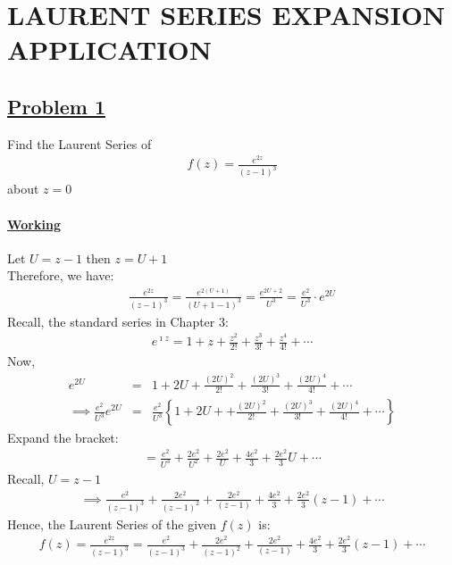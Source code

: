 \documentclass[12pt]{report}
\newcommand{\ubt}[1]{\textbf{\underline{#1}}}
\newcommand{\sps}{\\[0.2cm]}
\newcommand{\imaginary}{\imath}
\newcommand{\problem}[1]{\section*{\ubt{Problem #1}}}
\newcommand{\working}{\subsubsection{\ubt{Working}}}
\begin{document}
	\chapter{LAURENT SERIES EXPANSION APPLICATION}
	\problem{1}
	Find the Laurent Series of 
	\begin{eqnarray*}
		f(z) = \frac{e^{2z}}{(z-1)^3}
	\end{eqnarray*}
	about $z=0$
	\working
	Let $U=z-1$ then $z=U+1$\\
	Therefore, we have:
	\begin{eqnarray*}
		\frac{e^{2z}}{(z-1)^3} = \frac{e^{2(U+1)}}{(U+1-1)^3} = \frac{e^{2U+2}}{U^3} = \frac{e^2}{U^3} \cdot e^{2U}
	\end{eqnarray*}
	Recall, the standard series in Chapter 3:
	\begin{eqnarray*}
		e^{\imaginary z} = 1 + z + \frac{z^2}{2!} + \frac{z^3}{3!} + \frac{z^4}{4!} + \cdots
	\end{eqnarray*}
	Now, 
	\begin{eqnarray*}
		e^{2U} &=& 1 + 2U + \frac{(2U)^2}{2!} + \frac{(2U)^3}{3!}+ \frac{(2U)^4}{4!} + \cdots\sps
		\implies \frac{e^2}{U^3}e^{2U} &=&\frac{e^2}{U^3}\left\{ 1 + 2U + + \frac{(2U)^2}{2!}+ \frac{(2U)^3}{3!}+ \frac{(2U)^4}{4!} + \cdots \right\}
	\end{eqnarray*}
	Expand the bracket:
	\begin{eqnarray*}
		= \frac{e^2}{U^3} + \frac{2e^2}{U^2} + \frac{2e^2}{U}+ \frac{4e^2}{3}+ \frac{2e^2}{3}U + \cdots 
	\end{eqnarray*}
	Recall, $U=z-1$
	\begin{eqnarray*}
		\implies \frac{e^2}{(z-1)^3} + \frac{2e^2}{(z-1)^2} + \frac{2e^2}{(z-1)} + \frac{4e^2}{3} + \frac{2e^2}{3}(z-1) + \cdots
	\end{eqnarray*}
	Hence, the Laurent Series of the given $f(z)$ is:
	\begin{eqnarray*}
		f(z) = \frac{e^{2z}}{(z-1)^3} = \frac{e^2}{(z-1)^3} + \frac{2e^2}{(z-1)^2} + \frac{2e^2}{(z-1)} + \frac{4e^2}{3} + \frac{2e^2}{3}(z-1)+\cdots 
	\end{eqnarray*}
	
\end{document}
